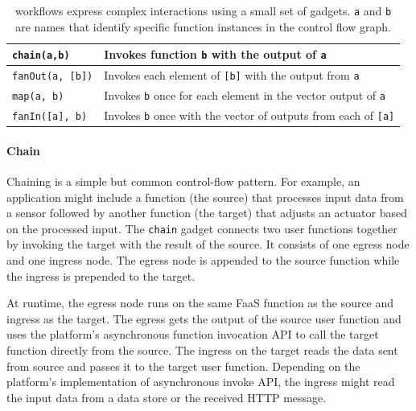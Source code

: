 \begin{table}[t!]
  \centering
  \begin{tabular}{ |m{8em}| m{13em} | }
    \hline
      \texttt{chain(a,b) }& Invokes function \texttt{b} with the output of \texttt{a} \\
    \hline
      \texttt{fanOut(a, [b])} & Invokes each element of \texttt{[b]} with the output from \texttt{a} \\
    \hline
      \texttt{map(a, b)} & Invokes \texttt{b} once for each element in the vector output of \texttt{a} \\
    \hline
      \texttt{fanIn([a], b)} & Invokes \texttt{b} once with the vector of outputs from each of \texttt{[a]} \\
    \hline
\end{tabular}
  \caption{\name{} workflows express complex interactions using a small set of
  gadgets. \texttt{a} and \texttt{b} are names that identify specific function
  instances in the control flow graph.}
  \label{tab:gadgets}
\end{table}


\paragraph{Chain}
Chaining is a simple but common control-flow pattern. For example, an
application might include a function (the source) that processes input data
from a sensor followed by another function (the target) that adjusts an
actuator based on the processed input. The \texttt{chain} gadget connects two
user functions together by invoking the target with the result of the source.
It consists of one egress node and one ingress node. The egress node is
appended to the source function while the ingress is prepended to the target.

At runtime, the egress node runs on the same FaaS function as the source and
ingress as the target. The egress gets the output of the source user function
and uses the platform's asynchronous function invocation API to call the
target function directly from the source. The ingress on the target reads the
data sent from source and passes it to the target user function. Depending on
the platform's implementation of asynchronous invoke API, the ingress might
read the input data from a data store or the received HTTP message.


